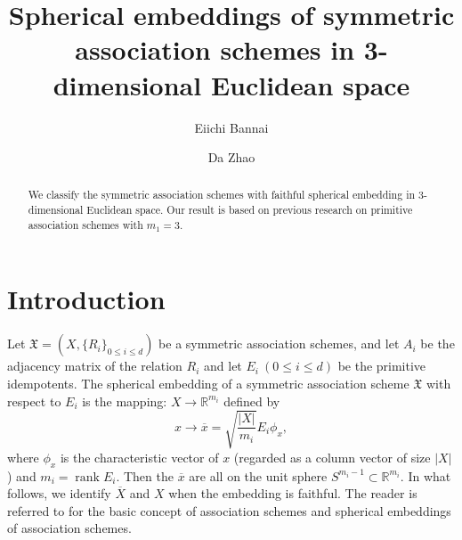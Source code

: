 \documentclass[12pt]{amsart}
\DeclareMathOperator{\rank}{rank}
\begin{document}
\title[Spherical embeddings of symmetric association schemes in $\mathbb{R}^3$]{Spherical embeddings of symmetric association schemes in 3-dimensional 
Euclidean space}



\author{Eiichi Bannai \and Da Zhao}
\address{School of Mathematical Sciences, Shanghai Jiao Tong University, Shanghai, China.}











\begin{abstract}
We classify the symmetric association schemes with faithful spherical embedding in 3-dimensional Euclidean space. Our result is based on previous research on primitive association schemes with $m_1 = 3$.


\end{abstract}

\maketitle



\section{Introduction}


Let $\mathfrak X=(X,\{R_i\}_{0\leq i\leq d})$ be a symmetric association schemes, 
and let $A_i$ be the adjacency matrix of the relation $R_i$ and let 
$E_i~  (0\leq i\leq d)$ be the primitive idempotents. The spherical embedding of a 
symmetric association scheme $\mathfrak X$ with respect to $E_i$ is the mapping: $X \rightarrow \mathbb R^{m_i}$ defined by
$$x\rightarrow \overline{x}=\sqrt{\frac{|X|}{m_i}}E_i\phi_{x},$$ 
where $\phi_{x}$ is the characteristic vector of $x$ (regarded as a column vector 
of size $|X|$) and $m_i=\rank E_i.$ 
Then the $\overline{x}$ are all on the unit sphere $S^{m_i-1}\subset \mathbb R^{m_i}.$ 
In what follows, we identify $\overline{X}$ and $X$ when the embedding is faithful.
The reader is referred to \cite{MR2212140,BBI16,MR882540,MR1002568} for the basic concept of association schemes 
and spherical embeddings of association schemes.
\end{document}
